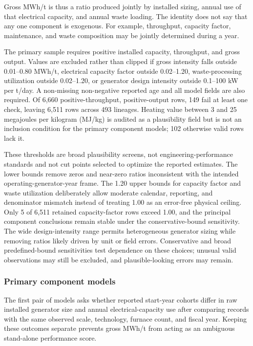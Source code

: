 \documentclass[12pt,a4paper]{article}
\begin{document}
Gross MWh/t is thus a ratio produced jointly by installed sizing, annual use of
that electrical capacity, and annual waste loading. The identity does not say
that any one component is exogenous. For example, throughput, capacity factor,
maintenance, and waste composition may be jointly determined during a year.

The primary sample requires positive installed capacity, throughput, and gross
output. Values are excluded rather than clipped if gross intensity falls
outside 0.01--0.80 MWh/t, electrical capacity factor outside 0.02--1.20,
waste-processing utilization outside 0.02--1.20, or generator design intensity
outside 0.1--100 kW per t/day. A non-missing non-negative reported age and all
model fields are also required. Of 6,660 positive-throughput, positive-output
rows, 149 fail at least one check, leaving 6,511 rows across 493 lineages.
Heating value between 3 and 25 megajoules per kilogram (MJ/kg) is audited as a
plausibility field but is not an inclusion condition for the primary component
models; 102 otherwise valid rows lack it.

These thresholds are broad plausibility screens, not engineering-performance
standards and not cut points selected to optimize the reported estimates. The
lower bounds remove zeros and near-zero ratios inconsistent with the intended
operating-generator-year frame. The 1.20 upper bounds for capacity factor and
waste utilization deliberately allow moderate calendar, reporting, and
denominator mismatch instead of treating 1.00 as an error-free physical ceiling.
Only 5 of 6,511 retained capacity-factor rows exceed 1.00, and the principal
component conclusions remain stable under the conservative-bound sensitivity.
The wide design-intensity range permits heterogeneous generator sizing while
removing ratios likely driven by unit or field errors. Conservative and broad
predefined-bound sensitivities test dependence on these choices; unusual valid
observations may still be excluded, and plausible-looking errors may remain.

\subsubsection{Primary component models}

The first pair of models asks whether reported start-year cohorts differ in raw
installed generator size and annual electrical-capacity use after comparing
records with the same observed scale, technology, furnace count, and fiscal
year. Keeping these outcomes separate prevents gross MWh/t from acting as an
ambiguous stand-alone performance score.
\end{document}
